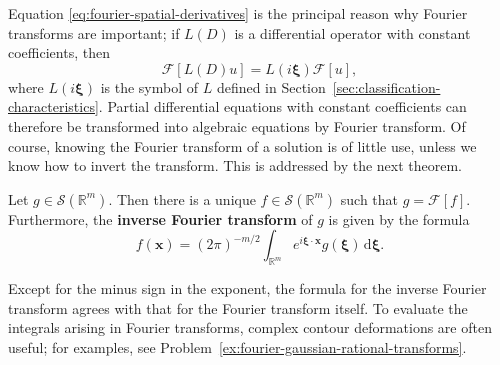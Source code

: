 Equation \eqref{eq:fourier-spatial-derivatives} is the principal reason why Fourier transforms are important; if $L(D)$ is a differential operator with constant coefficients, then
\begin{equation}\label{eq:fourier-constant-coefficient-operator-symbol}
\mathcal{F}[L(D)u]=L(i\bm{\xi})\mathcal{F}[u],
\end{equation}
where $L(i\bm{\xi})$ is the symbol of $L$ defined in Section~\ref{sec:classification-characteristics}. Partial differential equations with constant coefficients can therefore be transformed into algebraic equations by Fourier transform. Of course, knowing the Fourier transform of a solution is of little use, unless we know how to invert the transform. This is addressed by the next theorem.

\begin{Theorem}
\label{thm:fourier-inversion}
Let $g\in\mathcal{S}(\mathbb{R}^m)$. Then there is a unique $f\in\mathcal{S}(\mathbb{R}^m)$ such that $g=\mathcal{F}[f]$. Furthermore, the \textbf{inverse Fourier transform} of $g$ is given by the formula
\begin{equation}\label{eq:fourier-inversion-formula}
f(\bm{x})=(2\pi)^{-m/2}\int_{\mathbb{R}^m}e^{i\bm{\xi}\cdot\bm{x}}g(\bm{\xi})\,\mathrm{d}\bm{\xi}.
\end{equation}

\end{Theorem}

Except for the minus sign in the exponent, the formula for the inverse Fourier transform agrees with that for the Fourier transform itself. To evaluate the integrals arising in Fourier transforms, complex contour deformations are often useful; for examples, see Problem~\ref{ex:fourier-gaussian-rational-transforms}.

